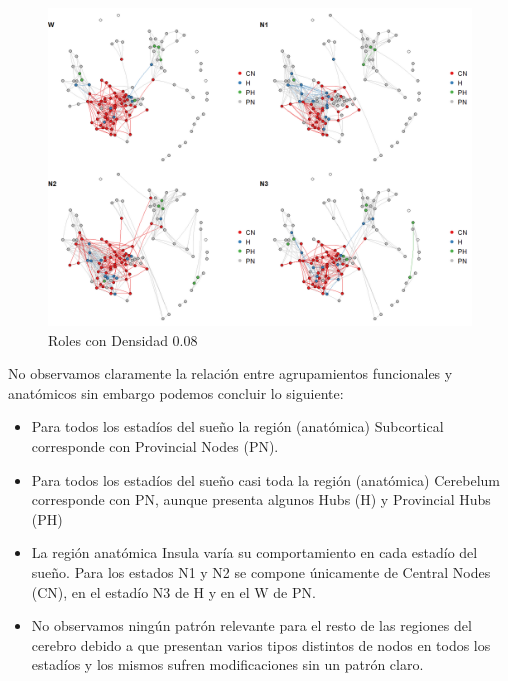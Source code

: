 \begin{figure}[H]
    \centering
    \includegraphics[width=\textwidth]{img/5_redes_roles008.png}
    \caption{Roles con Densidad 0.08}
    \label{fig:Ejer5_redes_roles008}
\end{figure}

No observamos claramente la relación entre agrupamientos funcionales y anatómicos sin embargo podemos concluir lo siguiente:

\begin{itemize} 
\item Para todos los estadíos del sueño la región (anatómica) Subcortical corresponde con Provincial Nodes (PN).
\item Para todos los estadíos del sueño casi toda la región (anatómica) Cerebelum corresponde con PN, aunque presenta algunos Hubs (H) y Provincial Hubs (PH)
\item La región anatómica Insula varía su comportamiento en cada estadío del sueño. Para los estados N1 y N2 se compone únicamente de Central Nodes (CN), en el estadío N3 de H y en el W de PN.
\item No observamos ningún patrón relevante para el resto de las regiones del cerebro debido a  que presentan varios tipos distintos de nodos en todos los estadíos y los mismos sufren modificaciones sin un patrón claro.
\end{itemize}